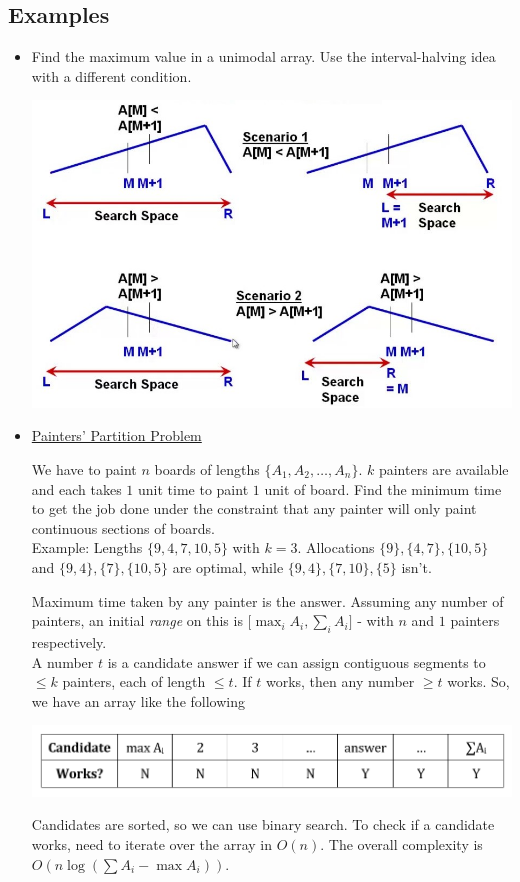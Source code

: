 \documentclass{article}
\newcommand{\I}[1]{\textit{#1}}
\begin{document}
\begin{sloppypar}
    \subsection{Examples}
    \begin{itemize}
        \item Find the maximum value in a unimodal array. Use the interval-halving idea with a different condition.
        \begin{center}
            \includegraphics[width = 0.8\linewidth]{../images/unimodal.jpg}
        \end{center}
        \item \href{https://www.geeksforgeeks.org/the-painters-partition-problem-using-binary-search/}{Painters' Partition Problem}
        \begin{displayquote}
            We have to paint $n$ boards of lengths $\{A_1, A_2, \dots, A_n\}$. $k$ painters are available and each takes $1$ unit time to paint $1$ unit of board. Find the minimum time to get the job done under the constraint that any painter will only paint continuous sections of boards.\\
            Example: Lengths $\{9, 4, 7, 10, 5\}$ with $k=3$. Allocations $\{9\}, \{4, 7\}, \{10, 5\}$ and $\{9, 4\}, \{7\}, \{10, 5\}$ are optimal, while $\{9, 4\}, \{7, 10\}, \{5\}$ isn't.
        \end{displayquote}
        Maximum time taken by any painter is the answer. Assuming any number of painters, an initial \I{range} on this is $\big[\max_{i} A_i,\sum_{i}A_i\big]$ - with $n$ and $1$ painters respectively.\\
        A number $t$ is a candidate answer if we can assign contiguous segments to $\le k$ painters, each of length $\le t$. If $t$ works, then any number $\ge t$ works. So, we have an array like the following
        \begin{center}
            \includegraphics[width = 0.8\linewidth]{../images/painter.png}
        \end{center}
        Candidates are sorted, so we can use binary search. To check if a candidate works, need to iterate over the array in $O(n)$. The overall complexity is $O(n\log (\sum A_i - \max{A_i}))$.


\end{itemize}
\end{sloppypar}
\end{document}
